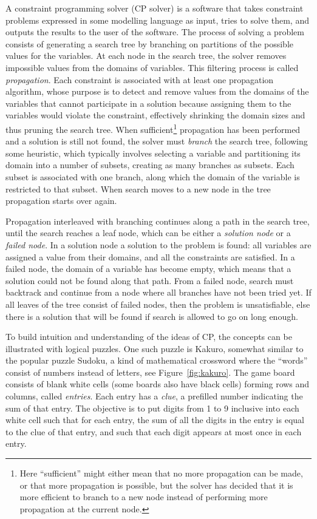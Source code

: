 \documentclass[a4paper,11pt]{article}
\theoremstyle{definition}
\numberwithin{equation}{section}
\begin{document}
A constraint programming solver (CP solver) is a software that
takes constraint problems expressed in some modelling language as input,
tries to solve them, and outputs the results to the user of the software.
The process of solving a problem consists of generating a search tree by branching
on partitions of the possible values for the variables.
At each node in the search tree,
the solver removes impossible values from the domains of variables.
This filtering process is called \emph{propagation}. Each constraint is
associated with at least one propagation algorithm, whose purpose is to detect
and remove values from the domains of the variables
that cannot participate in a solution because assigning them to
the variables would violate the constraint,
effectively shrinking the domain sizes and thus
pruning the search tree.
When sufficient\footnote{Here ``sufficient'' might either mean that no more
  propagation can be made, or that more propagation is possible,
  but the solver has decided that it is more efficient to branch to a new node instead of
  performing more propagation at the current node.}
propagation has been performed and a solution is still not found,
the solver must \emph{branch} the search tree, following some heuristic,
which typically involves selecting a variable and partitioning its domain
into a number of subsets, creating as many branches as subsets.
Each subset is associated with one branch, along which the domain
of the variable is restricted to that subset.
When search moves to a new node in the tree propagation starts over again.

Propagation interleaved with branching continues along a path in the search tree,
until the search reaches a leaf node, which can be either a
\emph{solution node} or a \emph{failed node}.
In a solution node a solution to the problem is found:
all variables are assigned a value
from their domains, and all the constraints are satisfied.
In a failed node, the domain of a variable has become empty, which
means that a solution could not be found along that path.
From a failed node, search must backtrack and continue from a node where all branches
have not been tried yet. If all leaves of the tree consist of failed nodes, then
the problem is unsatisfiable, else there is a solution that will be
found if search is allowed to go on long enough.

To build intuition and understanding of the ideas of CP,
the concepts can be illustrated with logical puzzles. One such
puzzle is Kakuro, somewhat similar to the popular puzzle Sudoku,
a kind of mathematical crossword where the ``words'' consist
of numbers instead of letters, see Figure~\ref{fig:kakuro}.
The game board consists of
blank white cells (some boards also have black cells)
forming rows and columns, called \emph{entries}.
Each entry has a \emph{clue}, a prefilled number indicating the sum of that entry.
The objective is to put digits from 1 to 9 inclusive into each white cell such
that for each entry,
the sum of all the digits in the entry is equal to the clue of that entry,
and such that each digit appears at most once in each entry.
\end{document}
